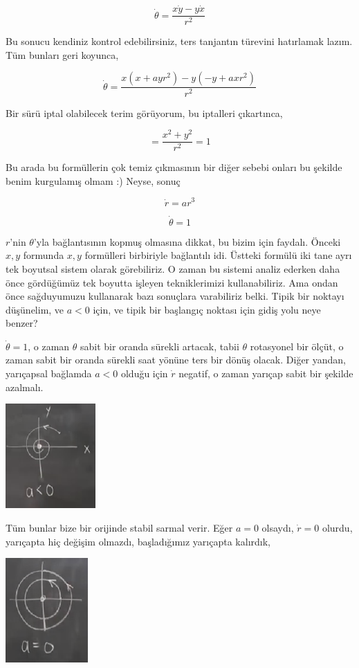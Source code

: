 \documentclass[12pt,fleqn]{article}\usepackage{../../common}
\begin{document}
$$ \dot{\theta} = \frac{x\dot{y} - y\dot{x}}{r^2} $$

Bu sonucu kendiniz kontrol edebilirsiniz, ters tanjantın türevini hatırlamak
lazım. Tüm bunları geri koyunca,

$$ \dot{\theta} = \frac{x (x+ayr^2) - y(-y+axr^2)}{r^2} $$

Bir sürü iptal olabilecek terim görüyorum, bu iptalleri çıkartınca,

$$ = \frac{x^2+y^2}{r^2} = 1 $$

Bu arada bu formüllerin çok temiz çıkmasının bir diğer sebebi onları bu şekilde
benim kurgulamış olmam :) Neyse, sonuç

$$ \dot{r} = ar^3 $$

$$ \dot{\theta} = 1 $$

$r$'nin $\theta$'yla bağlantısının kopmuş olmasına dikkat, bu bizim için
faydalı. Önceki $x,y$ formunda $x,y$ formülleri birbiriyle bağlantılı
idi. Üstteki formülü iki tane ayrı tek boyutsal sistem olarak görebiliriz. O
zaman bu sistemi analiz ederken daha önce gördüğümüz tek boyutta işleyen
tekniklerimizi kullanabiliriz. Ama ondan önce sağduyumuzu kullanarak bazı
sonuçlara varabiliriz belki. Tipik bir noktayı düşünelim, ve $a < 0$ için, ve
tipik bir başlangıç noktası için gidiş yolu neye benzer?

$\dot{\theta}=1$, o zaman $\theta$ sabit bir oranda sürekli artacak, tabii
$\theta$ rotasyonel bir ölçüt, o zaman sabit bir oranda sürekli saat yönüne ters
bir dönüş olacak. Diğer yandan, yarıçapsal bağlamda $a<0$ olduğu için $\dot{r}$
negatif, o zaman yarıçap sabit bir şekilde azalmalı. 

\includegraphics[height=4cm]{06_03.png}

Tüm bunlar bize bir orijinde stabil sarmal verir. Eğer $a=0$ olsaydı,
$\dot{r}=0$ olurdu, yarıçapta hiç değişim olmazdı, başladığımız yarıçapta
kalırdık,

\includegraphics[height=4cm]{06_04.png}
\end{document}
